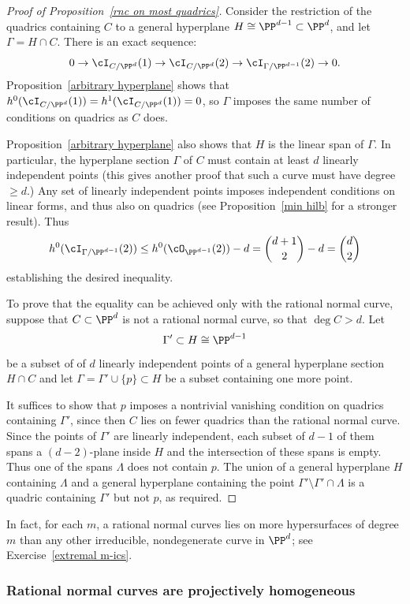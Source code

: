 \begin{proof}[Proof of Proposition~\ref{rnc on most quadrics}]
Consider the restriction of the quadrics containing $C$ to a general hyperplane $H \cong \PP^{d-1} \subset \PP^d$, and let $\Gamma = H \cap C$. There is an exact sequence:
$$
0 \to \cI_{C/\PP^d}(1) \to \cI_{C/\PP^d}(2) \to \cI_{\Gamma/\PP^{d-1}}(2) \to 0.
$$ 
Proposition~\ref{arbitrary hyperplane} shows that $h^0(\cI_{C/\PP^d}(1)) = h^1(\cI_{C/\PP^d}(1))=0$, so $\Gamma$
imposes the same number of conditions on quadrics as $C$ does.

Proposition~\ref{arbitrary hyperplane} also shows that $H$ is the linear span of  $\Gamma$. In particular, the hyperplane section $\Gamma$ of $C$ must contain at least $d$ linearly independent points (this gives another proof that
such a curve must have degree $\geq d$.)
Any set of linearly independent points imposes independent conditions on linear forms, and thus also on quadrics (see 
Proposition~\ref{min hilb} for a stronger result). Thus
$$
h^0(\cI_{\Gamma/\PP^{d-1}}(2)) \leq h^0(\cO_{\PP^{d-1}}(2)) - d = \binom{d+1}{2} - d = \binom{d}{2}
$$
establishing the desired inequality. 

To prove that the equality can be achieved only with the rational normal curve, suppose that $C\subset \PP^{d}$
is not a rational normal curve, so that $\deg C >d$. Let
$$
\Gamma' \subset H \cong \PP^{d-1}
$$
be a subset of of $d$ linearly independent points of a general hyperplane section $H\cap C$
and let $\Gamma = \Gamma'\cup\{p\}\subset H$ be a subset containing one more point.

It suffices to show that $p$ imposes a nontrivial vanishing condition on quadrics containing $\Gamma'$, since
then $C$ lies on fewer quadrics than the rational normal curve.
Since the points of $\Gamma'$ are linearly independent, each subset of $d-1$ of them spans a $(d-2)$-plane inside $H$ and the intersection of these spans is empty. Thus one of the spans $\Lambda$ does not contain $p$.
The union of  a general hyperplane $H$ containing $\Lambda$ and a general hyperplane containing 
the point $\Gamma' \setminus \Gamma'\cap \Lambda$
is a quadric containing $\Gamma'$ but not $p$, as required. 
\end{proof}

In fact, for each $m$, a rational normal curves lies on more hypersurfaces of degree $m$ than any other irreducible, nondegenerate curve in $\PP^d$; see Exercise~\ref{extremal m-ics}. 

\subsubsection{Rational normal curves are projectively homogeneous}

